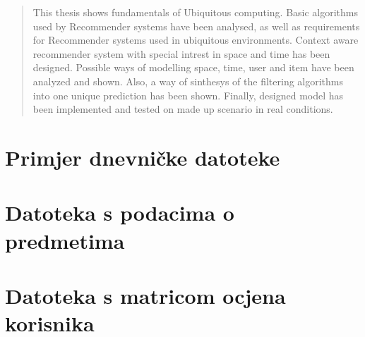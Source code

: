 \documentclass[times, utf8, diplomski, numeric]{fer}
\begin{document}
\begin{abstract}
This thesis shows fundamentals of Ubiquitous computing. Basic algorithms used by
Recommender systems have been analysed, as well as requirements for Recommender
systems used in ubiquitous environments. Context aware recommender system with
special intrest in space and time has been designed. Possible ways of modelling
space, time, user and item have been analyzed and shown. Also, a way of
sinthesys of the filtering algorithms into one unique prediction has been shown.
Finally, designed model has been implemented and tested on made up scenario in
real conditions.

\end{abstract}

\appendix
\chapter{Primjer dnevničke datoteke}

	
\chapter{Datoteka s podacima o predmetima}


\chapter{Datoteka s matricom ocjena korisnika}

	
\end{document}
